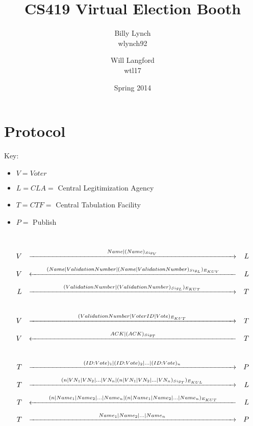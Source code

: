 \documentclass{article}
\title{CS419 Virtual Election Booth}
\author{Billy Lynch \\ wlynch92 \and Will Langford \\ wtl17}
\date{Spring 2014}
\begin{document}
\maketitle
\section{Protocol}

Key:
\begin{itemize}[label={}]
	\item $V = Voter$
	\item $L = CLA = $ Central Legitimization Agency
	\item $T = CTF = $ Central Tabulation Facility
	\item $P = $ Publish
\end{itemize}
\hfill\\
\begin{align*}
	V && \xrightarrow[\hspace*{10cm}]{Name|(Name)_{Sig_{V}}} && L \\
	V && \xleftarrow[\hspace*{10cm}]{(Name|Validation Number|(Name|Validation Number)_{Sig_{L}})_{E_{KUV}}} && L \\
	L && \xrightarrow[\hspace*{10cm}]{(Validation Number|(Validation Number)_{Sig_{L}})_{E_{KUT}}} && T \\
	\hfill\\
	V && \xrightarrow[\hspace*{10cm}]{(Validation Number|Voter ID|Vote)_{E_{KUT}}} && T \\
	V && \xleftarrow[\hspace*{10cm}]{ACK|(ACK)_{Sig_{T}}} && T \\
	\hfill\\
	T && \xrightarrow[\hspace*{10cm}]{(ID:Vote)_1|(ID:Vote)_2|\dots|(ID:Vote)_n} && P \\
	T && \xrightarrow[\hspace*{10cm}]{(n|VN_1|VN_2|\dots|VN_n|(n|VN_1|VN_2|\dots|VN_n)_{Sig_T})_{E_{KUL}}} && L \\
	T && \xleftarrow[\hspace*{10cm}]{(n|Name_1|Name_2|\dots|Name_n|(n|Name_1|Name_2|\dots|Name_n)_{E_{KUT}}} && L \\
	T && \xrightarrow[\hspace*{10cm}]{Name_1|Name_2|\dots|Name_n} && P
\end{align*}
\end{document}
